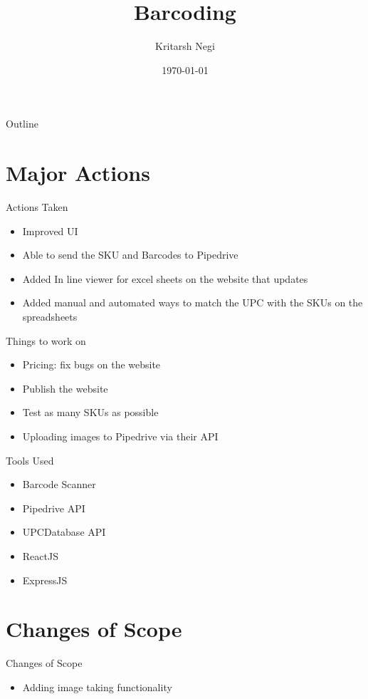 \documentclass[aspectratio=1610]{beamer}
\title{Barcoding}
\author{Kritarsh Negi}
\institute{The CPAP Box}
\date{\today}
\begin{document}
\begin{frame}
    \titlepage
\end{frame}

\begin{frame}{Outline}
    \tableofcontents
\end{frame}

\section{Major Actions}
\begin{frame}{Actions Taken}
    \begin{itemize}
        \item Improved UI
        \item Able to send the SKU and Barcodes to Pipedrive
        \item Added In line viewer for excel sheets on the website that updates
        \item Added manual and automated ways to match the UPC with the SKUs on the spreadsheets
    \end{itemize}
\end{frame}
\begin{frame}{Things to work on }
    \begin{itemize}
        \item Pricing: fix bugs on the website
        \item Publish the website
        \item Test as many SKUs as possible
        \item Uploading images to Pipedrive via their API
    \end{itemize}
\end{frame}
\begin{frame}{Tools Used}
    \begin{itemize}
        \item Barcode Scanner
        \item Pipedrive API
        \item UPCDatabase API
        \item ReactJS
        \item ExpressJS
    \end{itemize}
\end{frame}
\section{Changes of Scope}
\begin{frame}{Changes of Scope}
    \begin{itemize}
        \item Adding image taking functionality 
    \end{itemize}
\end{frame}
\end{document}
